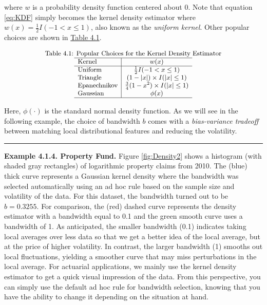 \documentclass[]{book}
\theoremstyle{definition}
\theoremstyle{definition}
\theoremstyle{definition}
\theoremstyle{remark}
\begin{document}
where \(w\) is a probability density function centered about 0. Note
that equation \eqref{eq:KDF} simply becomes the kernel density estimator
where \(w(x) = \frac{1}{2}I(-1 < x \le 1)\), also known as the
\emph{uniform kernel}. Other popular choices are shown in
\protect\hyperlink{tab:41}{Table 4.1}.

\[
{\small
\begin{matrix}
\text{Table 4.1: Popular Choices for the Kernel Density Estimator}\\
\begin{array}{l|cc}
\hline
\text{Kernel} &  w(x) \\
\hline
\text{Uniform } &  \frac{1}{2}I(-1 < x \le 1) \\
\text{Triangle} &  (1-|x|)\times I(|x| \le 1) \\
\text{Epanechnikov} & \frac{3}{4}(1-x^2) \times I(|x| \le 1) \\
\text{Gaussian} & \phi(x) \\
\hline
\end{array}\end{matrix}
}
\]

Here, \(\phi(\cdot)\) is the standard normal density function. As we
will see in the following example, the choice of bandwidth \(b\) comes
with a \emph{bias-variance tradeoff} between matching local
distributional features and reducing the volatility.

\begin{center}\rule{0.5\linewidth}{\linethickness}\end{center}

\textbf{Example 4.1.4. Property Fund.} Figure \ref{fig:Density2} shows a
histogram (with shaded gray rectangles) of logarithmic property claims
from 2010. The (blue) thick curve represents a Gaussian kernel density
where the bandwidth was selected automatically using an ad hoc rule
based on the sample size and volatility of the data. For this dataset,
the bandwidth turned out to be \(b=0.3255\). For comparison, the (red)
dashed curve represents the density estimator with a bandwidth equal to
0.1 and the green smooth curve uses a bandwidth of 1. As anticipated,
the smaller bandwidth (0.1) indicates taking local averages over less
data so that we get a better idea of the local average, but at the price
of higher volatility. In contrast, the larger bandwidth (1) smooths out
local fluctuations, yielding a smoother curve that may miss
perturbations in the local average. For actuarial applications, we
mainly use the kernel density estimator to get a quick visual impression
of the data. From this perspective, you can simply use the default ad
hoc rule for bandwidth selection, knowing that you have the ability to
change it depending on the situation at hand.
\end{document}
